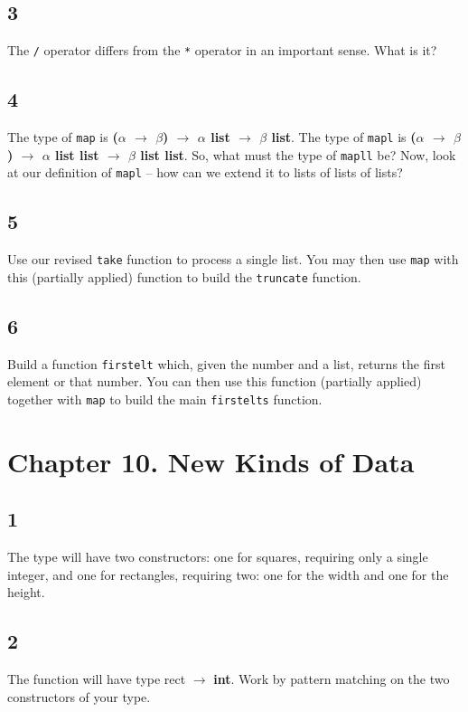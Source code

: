 \documentclass[]{book}
\begin{document}
\subsection*{3}
The \texttt{/} operator differs from the \texttt{*} operator in an important sense. What is it?

\subsection*{4}
The type of \texttt{map} is \textbf{\textsf{\textmd{(}$\alpha$ $\rightarrow$ $\beta$\textmd{)} $\rightarrow$ $\alpha$ list $\rightarrow$ $\beta$ list}}. The type of \texttt{mapl} is \textbf{\textsf{\textmd{(}$\alpha$ $\rightarrow$ $\beta$\textmd{)} $\rightarrow$ $\alpha$ list list $\rightarrow$ $\beta$ list list}}. So, what must the type of \texttt{mapll} be? Now, look at our definition of \texttt{mapl} -- how can we extend it to lists of lists of lists?

\subsection*{5}
Use our revised \texttt{take} function to process a single list. You may then use \texttt{map} with this (partially applied) function to build the \texttt{truncate} function.

\subsection*{6}
Build a function \texttt{firstelt} which, given the number and a list, returns the first element or that number. You can then use this function (partially applied) together with \texttt{map} to build the main \texttt{firstelts} function.

\section*{Chapter 10. New Kinds of Data}
\subsection*{1}
The type will have two constructors: one for squares, requiring only a single integer, and one for rectangles, requiring two: one for the width and one for the height.

\subsection*{2}
The function will have type \textsf{rect $\rightarrow$ \textbf{int}}. Work by pattern matching on the two constructors of your type.
\end{document}
